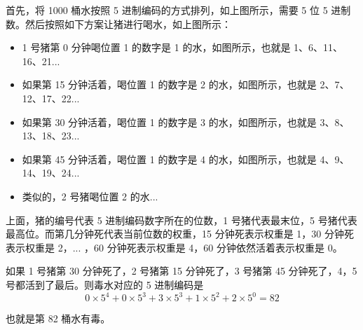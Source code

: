 \documentclass[12pt]{article}
\begin{document}
首先，将 1000 桶水按照 5 进制编码的方式排列，如上图所示，需要 5 位 5 进制数。然后按照如下方案让猪进行喝水，如上图所示：
\begin{itemize}[itemindent=2em]
    \item 1 号猪第 0 分钟喝位置 1 的数字是 1 的水，如图所示，也就是 1、6、11、16、21...
    
    \item 如果第 15 分钟活着，喝位置 1 的数字是 2 的水，如图所示，也就是 2、7、12、17、22...
    
    \item 如果第 30 分钟活着，喝位置 1 的数字是 3 的水，如图所示，也就是 3、8、13、18、23...
    
    \item 如果第 45 分钟活着，喝位置 1 的数字是 4 的水，如图所示，也就是 4、9、14、19、24...
    
    \item 类似的，2 号猪喝位置 2 的水...
\end{itemize}

上面，猪的编号代表 5 进制编码数字所在的位数，1 号猪代表最末位，5 号猪代表最高位。而第几分钟死代表当前位数的权重，15 分钟死表示权重是 1，30 分钟死表示权重是 2，... ，60 分钟死表示权重是 4，60 分钟依然活着表示权重是 0。

如果 1 号猪第 30 分钟死了，2 号猪第 15 分钟死了，3 号猪第 45 分钟死了，4，5 号都活到了最后。则毒水对应的 5 进制编码是
$$0\times5^4+0\times5^3+3\times5^3+1\times5^2+2\times5^0=82$$

也就是第 82 桶水有毒。



\end{document}
